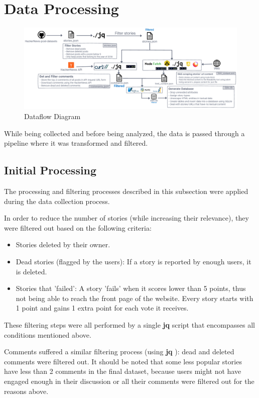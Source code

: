 \documentclass[sigconf]{acmart}
\begin{document}
\section{Data Processing}
\label{sec:processing}

\begin{figure}[htb!]
   \centering
   \includegraphics[width=\linewidth]{fig/dataflow_diagram.png}
    \caption{Dataflow Diagram}
    \label{fig:dataflow_diagram}
\end{figure}

While being collected and before being analyzed, the data is passed
through a pipeline where it was transformed and filtered.

\subsection{Initial Processing}
The processing and filtering processes described in this
subsection were applied during the data collection process.

In order to reduce the number of stories (while increasing their
relevance), they were filtered out based on the following criteria:
\begin{itemize}
    \item Stories deleted by their owner.
    \item Dead stories (flagged by the users): If a story is reported
        by enough users, it is deleted.
    \item Stories that 'failed': A story 'fails' when it scores
        lower than 5 points, thus not being able to reach the front
        page of the website. Every story starts with 1 point and gains
        1 extra point for each vote it receives.
\end{itemize}
These filtering steps were all performed by a single \textbf{jq}
\cite{jq} script that encompasses all conditions mentioned above.

Comments suffered a similar filtering process (using \textbf{jq} \cite{jq}):
dead and deleted comments were filtered out.
It should be noted that some less popular stories have less than
2 comments in the final dataset, because users might not have
engaged enough in their discussion or all their comments were filtered
out for the reasons above.
\end{document}
